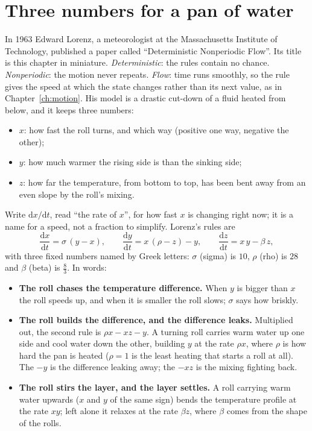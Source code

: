\section{Three numbers for a pan of water}
\label{sec:ch09-rules}

\noindent
In 1963 Edward Lorenz, a meteorologist at the Massachusetts Institute of
Technology, published a paper called \enquote{Deterministic Nonperiodic
Flow}. Its title is this chapter in miniature. \emph{Deterministic}: the
rules contain no chance. \emph{Nonperiodic}: the motion never repeats.
\emph{Flow}: time runs smoothly, so the rule gives the speed at which the
state changes rather than its next value, as in Chapter~\ref{ch:motion}. His
model is a drastic cut-down of a fluid heated from below, and it keeps three
numbers:

\begin{itemize}
\item $x$: how fast the roll turns, and which way (positive one way,
  negative the other);
\item $y$: how much warmer the rising side is than the sinking side;
\item $z$: how far the temperature, from bottom to top, has been bent away
  from an even slope by the roll's mixing.
\end{itemize}

\noindent
Write $\mathrm{d}x/\mathrm{d}t$, read \enquote{the rate of $x$}, for how
fast $x$ is changing right now; it is a name for a speed, not a fraction to
simplify. Lorenz's rules are
\[
\frac{\mathrm{d}x}{\mathrm{d}t} = \sigma\,(y - x), \qquad
\frac{\mathrm{d}y}{\mathrm{d}t} = x\,(\rho - z) - y, \qquad
\frac{\mathrm{d}z}{\mathrm{d}t} = x\,y - \beta\,z,
\]
with three fixed numbers named by Greek letters: $\sigma$ (sigma) is $10$,
$\rho$ (rho) is $28$ and $\beta$ (beta) is $\tfrac{8}{3}$. In words:

\begin{itemize}
\item \textbf{The roll chases the temperature difference.} When $y$ is bigger
  than $x$ the roll speeds up, and when it is smaller the roll slows;
  $\sigma$ says how briskly.
\item \textbf{The roll builds the difference, and the difference leaks.}
  Multiplied out, the second rule is $\rho x - xz - y$. A turning roll carries
  warm water up one side and cool water down the other, building $y$ at the
  rate $\rho x$, where $\rho$ is how hard the pan is heated ($\rho = 1$ is the
  least heating that starts a roll at all). The $-y$ is the difference leaking
  away; the $-xz$ is the mixing fighting back.
\item \textbf{The roll stirs the layer, and the layer settles.} A roll
  carrying warm water upwards ($x$ and $y$ of the same sign) bends the
  temperature profile at the rate $xy$; left alone it relaxes at the rate
  $\beta z$, where $\beta$ comes from the shape of the rolls.
\end{itemize}


